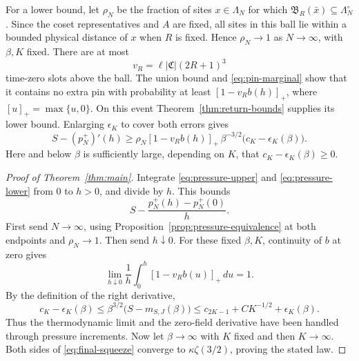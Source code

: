 For a lower bound, let $\rho_N$ be the fraction of sites $x\in\Lambda_N$
for which $\mathfrak B_R(\bar x)\subseteq\Lambda_N^\circ$. Since the
coset representatives and $A$ are fixed, all sites in this ball lie
within a bounded physical distance of $x$ when $R$ is fixed. Hence
$\rho_N\to1$ as $N\to\infty$, with $\beta,K$ fixed.
There are at most
\[
 v_R=\ell|\mathfrak C|(2R+1)^3
\]
time-zero slots above the ball. The union bound and
\eqref{eq:pin-marginal} show that it contains no extra pin with
probability at least $[1-v_Rb(h)]_+$, where $[u]_+=\max\{u,0\}$.
On this event Theorem~\ref{thm:return-bounds} supplies its lower bound.
Enlarging $\epsilon_K$ to cover both errors gives
\begin{equation}
 S-(p_N^+)'(h)
 \ge\rho_N[1-v_Rb(h)]_+\,
       \beta^{-3/2}\bigl(c_K-\epsilon_K(\beta)\bigr).
 \label{eq:pressure-lower}
\end{equation}
Here and below $\beta$ is sufficiently large, depending on $K$, that
$c_K-\epsilon_K(\beta)\ge0$.

\begin{proof}[Proof of Theorem~\ref{thm:main}]
Integrate \eqref{eq:pressure-upper} and \eqref{eq:pressure-lower}
from $0$ to $h>0$, and divide by $h$. This bounds
\[
 S-\frac{p_N^+(h)-p_N^+(0)}{h}.
\]
First send $N\to\infty$, using Proposition~\ref{prop:pressure-equivalence}
at both endpoints and $\rho_N\to1$. Then send $h\downarrow0$.
For these fixed $\beta,K$, continuity of $b$ at zero gives
\[
 \lim_{h\downarrow0}\frac1h\int_0^h[1-v_Rb(u)]_+\,du=1.
\]
By the definition of the right derivative,
\begin{equation}
 c_K-\epsilon_K(\beta)
 \le\beta^{3/2}\bigl(S-m_{S,J}(\beta)\bigr)
 \le c_{2K-1}+CK^{-1/2}+\epsilon_K(\beta).
 \label{eq:final-squeeze}
\end{equation}
Thus the thermodynamic limit and the zero-field derivative have been
handled through pressure increments. Now let $\beta\to\infty$ with
$K$ fixed and then $K\to\infty$. Both sides of
\eqref{eq:final-squeeze} converge to $\kappa\zeta(3/2)$, proving
the stated law.
\end{proof}
